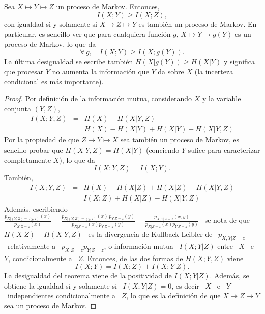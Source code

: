 \begin{teorema}
\label{Teo:SZ:DesigualdadPreocesamientoDatos}
%
  Sea  $X \mapsto  Y \mapsto  Z$ un  proceso de  Markov. Entonces,
  \[
  I(X;Y) \ge I(X;Z),
  \]
  con igualdad si y solamente si $X \mapsto Z \mapsto Y$ es tambi\'en un proceso
  de Markov. En  particular, es sencillo ver que  para cualquiera funci\'on $g$,
  $X \mapsto Y \mapsto g(Y)$ es un proceso de Markov, lo que da
  \[
  \forall \, g, \quad I(X;Y) \ge I(X;g(Y)).
  \]
  La  \'ultima  desigualdad  se  escribe  tambi\'en  $H(X|g(Y))  \ge  H(X|Y)$  y
  significa que  procesar $Y$ no aumenta  la informaci\'on que $Y$  da sobre $X$
  (la incerteza condicional es m\'as importante).
\end{teorema}
%
\begin{proof}
  Por definici\'on  de la  informaci\'on mutua, considerando  $X$ y  la variable
  conjunta $(Y,Z)$,
  \begin{eqnarray*}
  I(X ; Y,Z) & = & H(X) - H(X|Y,Z)\\[2.5mm]
  & = & H(X) - H(X|Y) + H(X|Y) - H(X|Y,Z)
  \end{eqnarray*}
  \noindent Por  la propiedad de  que $Z \mapsto  Y \mapsto X$ sea  tambi\'en un
  proceso de Markov,  es sencillo probar que $H(X|Y,Z)  = H(X|Y)$ (conciendo $Y$
  sufice para caracterizar completamente $X$), lo que da
  \[
  I(X;Y,Z) = I(X;Y).
  \]
  Tambi\'en,
  \begin{eqnarray*}
  I(X ; Y,Z) & = & H(X) - H(X|Z) + H(X|Z) - H(X|Y,Z)\\[2.5mm]
  & = & I(X;Z) + H(X|Z) - H(X|Y,Z)
  \end{eqnarray*}
  \noindent Adem\'as, escribiendo \ $\frac{p_{X|(Y,Z)=(y,z)}(x)}{p_{X|Z=z}(x)} =
  \frac{p_{X|(Y,Z)=(y,z)}(x)   \,  p_{Y|Z=z}(y)}{p_{X|Z=z}(x)   p_{Y|Z=z}(y)}  =
  \frac{p_{X,Y|Z=z}(x,y)}{p_{X|Z=z}(x) p_{Y|Z=z}(y)}$ \ se nota de que \ $H(X|Z)
  -  H(X|Y,Z)$ \  es la  divergencia de  Kullback-Leibler de  \  $p_{X,Y|Z=z}$ \
  relativamente a  \ $p_{X|Z=z} p_{Y|Z=z}$,  o informaci\'on mutua  \ $I(X;Y|Z)$
  entre \ $X$ \ e \ $Y$,  condicionalmente a \ $Z$.  Entonces, de las dos formas
  de $H(X;Y,Z)$ viene
  \[
  I(X;Y) = I(X;Z) + I(X;Y|Z).
  \]
  La desigualdad del teorema viene de la positividad de $I(X;Y|Z)$. Adem\'as, se
  obtiene la igualdad si  y solamente si \ $I(X;Y|Z) = 0$, es decir  \ $X$ \ e \
  $Y$ \  independientes condicionalmente a \  $Z$, lo que es  la definici\'on de
  que $X \mapsto Z \mapsto Y$ sea un proceso de Markov.
\end{proof}

